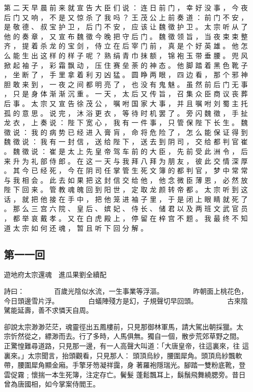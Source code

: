 {第 二 天 早 晨 前 来 就 宣 告 大 臣 们 说 ： 连 日 前 门 ， 幸 好 没 事 ， 今 夜 后 门 又 响 ， 不 是 又 惊 杀 了 我 吗 ？
王 茂 公 上 前 奏 道 ： 前 门 不 安 ， 是 敬 德 、 叔 宝 护 卫 ， 后 门 不 安 ， 应 该 让 魏 徵 护 卫 。
太 宗 听 从 了 他 的 奏 章 ， 又 宣 布 魏 徵 今 晚 把 守 后 门 。
魏 徵 领 旨 ， 当 夜 束 束 整 齐 ， 提 着 杀 龙 的 宝 剑 ， 侍 立 在 后 宰 门 前 ， 真 是 个 好 英 雄 。
他 怎 么 能 生 出 这 样 的 样 子 呢 ？ 熟 绢 青 巾 抹 额 ， 锦 袍 玉 带 垂 腰 。
兜 风 掀 起 袖 子 ， 彩 霜 飘 动 ， 压 住 赛 垒 荼 的 神 态 。
他 脚 踏 着 黑 色 靴 子 ， 坐 断 了 ， 手 里 拿 着 利 刃 凶 猛 。
圆 睁 两 眼 ， 四 边 看 ， 那 个 邪 神 胆 敢 来 到 ， 一 夜 之 间 都 明 亮 了 ， 也 没 有 鬼 魅 。
虽 然 前 后 门 无 事 ， 只 是 身 体 渐 渐 沉 重 。
一 天 ， 太 后 又 传 旨 ， 召 集 众 臣 商 议 丧 葬 后 事 。
太 宗 又 宣 告 徐 茂 公 ， 嘱 咐 国 家 大 事 ， 并 且 嘱 咐 刘 蜀 主 托 孤 的 意 思 。
说 完 ， 沐 浴 更 衣 ， 等 待 时 机 罢 了 。
旁 闪 魏 徵 ， 手 扯 龙 衣 ， 上 奏 说 ： 陛 下 宽 心 ， 我 有 一 件 事 ， 只 管 保 陛 下 长 生 。
魏 徵 说 ： 我 的 病 势 已 经 进 入 膏 肓 ， 命 将 危 险 了 ， 怎 么 能 保 证 得 到 魏 徵 说 ： 我 有 一 封 信 ， 送 给 陛 下 ， 送 去 到 阴 司 ， 交 给 都 判 官 崔 。
魏 徵 说 ： 崔 是 太 上 先 皇 帝 驾 车 前 的 大 臣 ， 先 前 受 此 洲 令 ， 后 来 升 为 礼 部 侍 郎 。
在 这 一 天 与 我 拜 八 拜 为 朋 友 ， 彼 此 交 情 深 厚 。
其 今 已 经 死 ， 今 在 阴 司 任 掌 管 生 死 文 簿 的 都 判 官 ， 梦 中 常 常 与 我 相 会 。
此 去 如 果 把 这 封 信 交 给 他 ， 他 念 微 臣 薄 恩 ， 必 然 放 陛 下 回 来 。
管 教 魂 魄 回 到 阳 世 ， 定 取 龙 颜 转 帝 都 。
太 宗 听 到 这 话 ， 就 把 他 接 在 手 中 ， 把 他 笼 进 袖 子 里 ， 于 是 闭 上 眼 睛 就 死 了 。
那 么 三 宫 六 院 、 皇 后 、 嫔 妃 、 侍 长 、 储 君 以 及 两 班 文 武 官 员 ， 都 举 哀 戴 孝 。
又 在 白 虎 殿 上 ， 停 留 在 梓 宫 不 题 。
我 最 终 不 知 道 太 宗 如 何 还 魂 ， 暂 且 听 下 回 分 解 。
}\switchcolumn\flushpage  \begin{pinyinscope}{\myfontt \section{第一一回}     遊地府太宗還魂　進瓜果劉全續配

詩曰：
　　　　百歲光陰似水流，一生事業等浮漚。
　　　　昨朝面上桃花色，今日頭邊雪片浮。
　　　　白蟻陣殘方是幻，子規聲切早回頭。
　　　　古來陰騭能延壽，善不求憐天自周。

卻說太宗渺渺茫茫，魂靈徑出五鳳樓前，只見那御林軍馬，請大駕出朝採獵。太
宗忻然從之，縹渺而去。行了多時，人馬俱無。獨自一個，散步荒郊草野之間。
正驚惶難尋道路，只見那一邊，有一人高聲大叫道：「大唐皇帝，往這裏來，往
這裏來。」太宗聞言，抬頭觀看，只見那人：
頭頂烏紗，腰圍犀角。頭頂烏紗飄軟帶，腰圍犀角顯金廂。手擎牙笏凝祥靄，身
著羅袍隱瑞光。腳踏一雙粉底靴，登雲促霧﹔懷揣一本生死簿，注定存亡。鬢髮
蓬鬆飄耳上，鬍鬚飛舞繞腮旁。昔日曾為唐國相，如今掌案侍閻王。

}
\end{pinyinscope}
